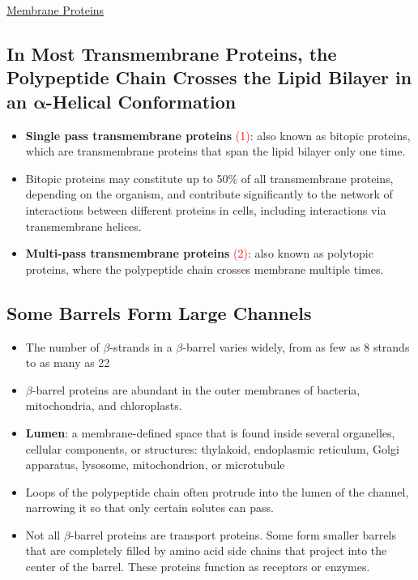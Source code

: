 \documentclass[12pt,letterpaper]{article}
\begin{document}
\begin{secbox}{\hyperlink{10}{Membrane Proteins}}
{    \subsection*{In Most Transmembrane Proteins, the Polypeptide Chain Crosses the Lipid Bilayer in an \(\bm{\alpha}\)-Helical Conformation}
    \begin{itemize}
        \item \textbf{Single pass transmembrane proteins} \textcolor{red}{(1)}: also known as bitopic proteins, which are transmembrane proteins that span the lipid bilayer only one time. 
        \item Bitopic proteins may constitute up to 50\% of all transmembrane proteins, depending on the organism, and contribute significantly to the network of interactions between different proteins in cells, including interactions via transmembrane helices.
        \item \textbf{Multi-pass transmembrane proteins} \textcolor{red}{(2)}: also known as polytopic proteins, where the polypeptide chain crosses membrane multiple times. 
    \end{itemize}

    \subsection*{Some \bfg{\beta} Barrels Form Large Channels}
    \begin{itemize}
        \item The number of \(\beta\)-strands in a \(\beta\)-barrel varies widely, from as few as 8 strands to as many as 22
        \item \(\beta\)-barrel proteins are abundant in the outer membranes of bacteria, mitochondria, and chloroplasts.
        \item \textbf{Lumen}: a membrane-defined space that is found inside several organelles, cellular components, or structures: thylakoid, endoplasmic reticulum, Golgi apparatus, lysosome, mitochondrion, or microtubule
        \item Loops of the polypeptide chain often protrude into the lumen of the channel, narrowing it so that only certain solutes can pass.
        \item Not all \(\beta\)-barrel proteins are transport proteins. Some form smaller barrels that are completely filled by amino acid side chains that project into the center of the barrel. These proteins function as receptors or enzymes.
    \end{itemize}

}
\end{secbox}
\end{document}
